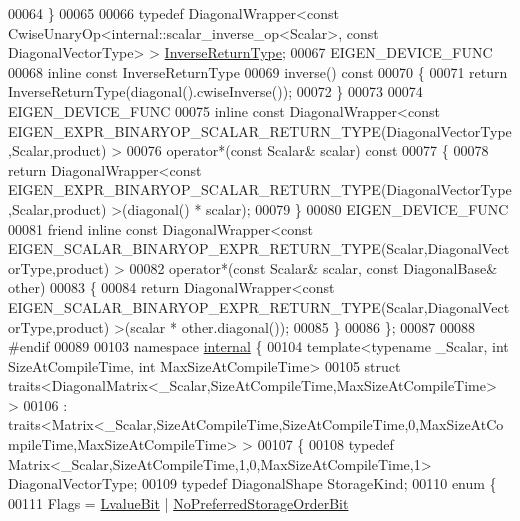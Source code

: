\begin{DoxyCode}
00064     \}
00065 
00066     \textcolor{keyword}{typedef} DiagonalWrapper<const CwiseUnaryOp<internal::scalar\_inverse\_op<Scalar>, \textcolor{keyword}{const} 
      DiagonalVectorType> > \hyperlink{group___core___module_class_eigen_1_1_cwise_unary_op}{InverseReturnType};
00067     EIGEN\_DEVICE\_FUNC
00068     \textcolor{keyword}{inline} \textcolor{keyword}{const} InverseReturnType
00069     inverse()\textcolor{keyword}{ const}
00070 \textcolor{keyword}{    }\{
00071       \textcolor{keywordflow}{return} InverseReturnType(diagonal().cwiseInverse());
00072     \}
00073     
00074     EIGEN\_DEVICE\_FUNC
00075     \textcolor{keyword}{inline} \textcolor{keyword}{const} DiagonalWrapper<const
       EIGEN\_EXPR\_BINARYOP\_SCALAR\_RETURN\_TYPE(DiagonalVectorType,Scalar,product) >
00076     operator*(\textcolor{keyword}{const} Scalar& scalar)\textcolor{keyword}{ const}
00077 \textcolor{keyword}{    }\{
00078       \textcolor{keywordflow}{return} DiagonalWrapper<const
       EIGEN\_EXPR\_BINARYOP\_SCALAR\_RETURN\_TYPE(DiagonalVectorType,Scalar,product) >(diagonal() * scalar);
00079     \}
00080     EIGEN\_DEVICE\_FUNC
00081     \textcolor{keyword}{friend} \textcolor{keyword}{inline} \textcolor{keyword}{const} DiagonalWrapper<const
       EIGEN\_SCALAR\_BINARYOP\_EXPR\_RETURN\_TYPE(Scalar,DiagonalVectorType,product) >
00082     operator*(\textcolor{keyword}{const} Scalar& scalar, \textcolor{keyword}{const} DiagonalBase& other)
00083     \{
00084       \textcolor{keywordflow}{return} DiagonalWrapper<const
       EIGEN\_SCALAR\_BINARYOP\_EXPR\_RETURN\_TYPE(Scalar,DiagonalVectorType,product) >(scalar * other.diagonal());
00085     \}
00086 \};
00087 
00088 \textcolor{preprocessor}{#endif}
00089 
00103 \textcolor{keyword}{namespace }\hyperlink{namespaceinternal}{internal} \{
00104 \textcolor{keyword}{template}<\textcolor{keyword}{typename} \_Scalar, \textcolor{keywordtype}{int} SizeAtCompileTime, \textcolor{keywordtype}{int} MaxSizeAtCompileTime>
00105 \textcolor{keyword}{struct }traits<DiagonalMatrix<\_Scalar,SizeAtCompileTime,MaxSizeAtCompileTime> >
00106  : traits<Matrix<\_Scalar,SizeAtCompileTime,SizeAtCompileTime,0,MaxSizeAtCompileTime,MaxSizeAtCompileTime> >
00107 \{
00108   \textcolor{keyword}{typedef} Matrix<\_Scalar,SizeAtCompileTime,1,0,MaxSizeAtCompileTime,1> DiagonalVectorType;
00109   \textcolor{keyword}{typedef} DiagonalShape StorageKind;
00110   \textcolor{keyword}{enum} \{
00111     Flags = \hyperlink{group__flags_gae2c323957f20dfdc6cb8f44428eaec1a}{LvalueBit} | \hyperlink{group__flags_ga3c186ad80ddcf5e2ed3d7ee31cca1860}{NoPreferredStorageOrderBit}

\end{DoxyCode}
